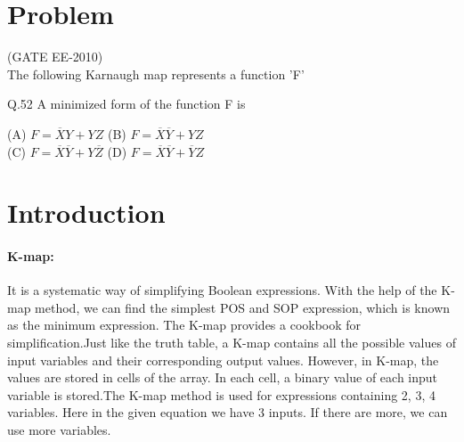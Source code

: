 \documentclass[10pt, a4paper]{article}
\title{\mytitle}
\author{\myauthor\hspace{1em}\\\contact\\FWC22099    IITH-Future Wireless Communications     Assignment-1\hspace{0.5em}\hspace{0.5em}\mymodule}
\date{}
\begin{document}
 \maketitle
     \tableofcontents
  \textbf{}{\mykeywords}
 \section{Problem}
 (GATE EE-2010) \\
The following Karnaugh map represents a function 'F'
 \begin{karnaugh-map}[4][2][1][$YZ$][$X$]
 \end{karnaugh-map}	
 
 Q.52 A minimized form of the function F is
 
 (A) $F = \overline{X}{Y} + YZ$ \hspace{2cm}   (B) $F = \overline{X}\overline{Y} + YZ$ \\
 
 (C) $F = \overline{X}\overline{Y} + Y\overline{Z}$ \hspace{2cm} (D) $F = \overline{X}\overline{Y} + \overline{Y}Z$
 
      
\section{Introduction}
 
\paragraph{K-map:}
It is a systematic way of simplifying Boolean expressions. With the help of the K-map method, we can find the simplest POS and SOP expression, which is known as the minimum expression. The K-map provides a cookbook for simplification.Just like the truth table, a K-map contains all the possible values of input variables and their corresponding output values. However, in K-map, the values are stored in cells of the array. In each cell, a binary value of each input variable is stored.The K-map method is used for expressions containing 2, 3, 4 variables. Here in the given equation we have 3 inputs. If there are more, we can use more variables.
      
      
      
\end{document}
